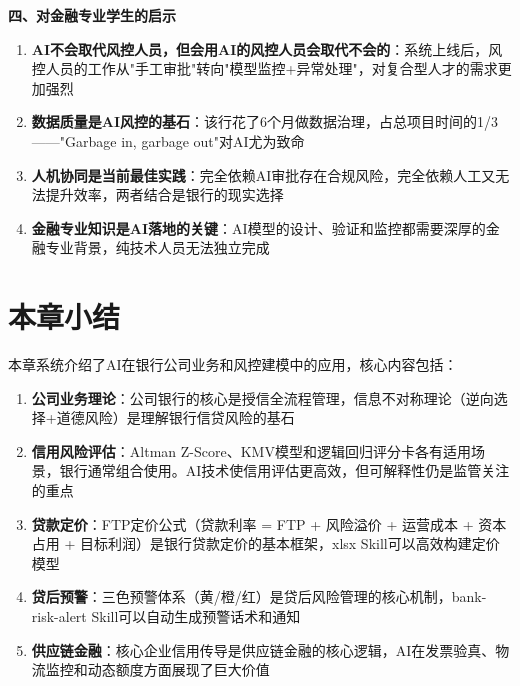\begin{casebox}[某城商行的风控升级之路]
\textbf{四、对金融专业学生的启示}

\begin{enumerate}[leftmargin=2em]
  \item \textbf{AI不会取代风控人员，但会用AI的风控人员会取代不会的}：系统上线后，风控人员的工作从"手工审批"转向"模型监控+异常处理"，对复合型人才的需求更加强烈
  \item \textbf{数据质量是AI风控的基石}：该行花了6个月做数据治理，占总项目时间的1/3——"Garbage in, garbage out"对AI尤为致命
  \item \textbf{人机协同是当前最佳实践}：完全依赖AI审批存在合规风险，完全依赖人工又无法提升效率，两者结合是银行的现实选择
  \item \textbf{金融专业知识是AI落地的关键}：AI模型的设计、验证和监控都需要深厚的金融专业背景，纯技术人员无法独立完成
\end{enumerate}
\end{casebox}


\section*{本章小结}

本章系统介绍了AI在银行公司业务和风控建模中的应用，核心内容包括：

\begin{enumerate}[leftmargin=2em]
  \item \textbf{公司业务理论}：公司银行的核心是授信全流程管理，信息不对称理论（逆向选择+道德风险）是理解银行信贷风险的基石
  \item \textbf{信用风险评估}：Altman Z-Score、KMV模型和逻辑回归评分卡各有适用场景，银行通常组合使用。AI技术使信用评估更高效，但可解释性仍是监管关注的重点
  \item \textbf{贷款定价}：FTP定价公式（贷款利率 = FTP + 风险溢价 + 运营成本 + 资本占用 + 目标利润）是银行贷款定价的基本框架，xlsx Skill可以高效构建定价模型
  \item \textbf{贷后预警}：三色预警体系（黄/橙/红）是贷后风险管理的核心机制，bank-risk-alert Skill可以自动生成预警话术和通知
  \item \textbf{供应链金融}：核心企业信用传导是供应链金融的核心逻辑，AI在发票验真、物流监控和动态额度方面展现了巨大价值
\end{enumerate}


